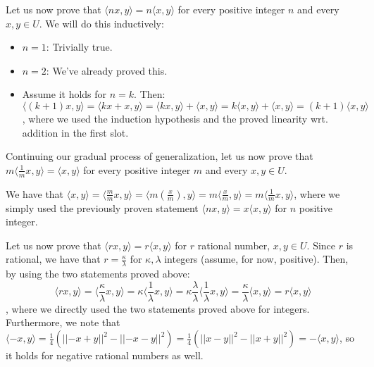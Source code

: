 \begin{solution}
\begin{itemize}
    Let us now prove that $\langle nx, y \rangle = n\langle x, y \rangle$ for every positive integer $n$ and every $x, y \in U$. We will do this inductively:
    \begin{itemize}
        \item $n = 1$: Trivially true.
        \item $n = 2$: We've already proved this.
        \item Assume it holds for $n = k$. Then: $\langle (k+1)x, y \rangle = \langle kx + x, y \rangle = \langle kx, y \rangle + \langle x, y \rangle = k\langle x , y \rangle + \langle x, y \rangle = (k+1)\langle x, y \rangle$, where we used the induction hypothesis and the proved linearity wrt. addition in the first slot.
    \end{itemize}

    Continuing our gradual process of generalization, let us now prove that $m\langle \frac{1}{m}x, y \rangle = \langle x, y \rangle$ for every positive integer $m$ and every $x ,y \in U$.

    We have that $\langle x, y \rangle = \langle \frac{m}{m}x, y \rangle = \langle m(\frac{x}{m}), y \rangle = m\langle \frac{x}{m}, y \rangle = m \langle \frac{1}{m}x, y \rangle$, where we simply used the previously proven statement $\langle nx, y \rangle = x \langle x, y \rangle$ for $n$ positive integer.

    Let us now prove that $\langle rx, y \rangle = r\langle x, y \rangle$ for $r$ rational number, $x, y \in U$. Since $r$ is rational, we have that $r = \frac{\kappa}{\lambda}$ for $\kappa, \lambda$ integers (assume, for now, positive). Then, by using the two statements proved above:
    $$\langle rx, y \rangle = \langle \frac{\kappa}{\lambda} x, y \rangle = \kappa \langle \frac{1}{\lambda}x, y \rangle = \kappa \frac{\lambda}{\lambda} \langle \frac{1}{\lambda}x, y \rangle = \frac{\kappa}{\lambda} \langle x, y \rangle = r \langle x, y \rangle$$
    , where we directly used the two statements proved above for integers. Furthermore, we note that $\langle -x, y \rangle = \frac{1}{4}(\lvert \lvert -x + y \rvert \rvert^2 - \lvert \lvert -x - y \rvert \rvert^2) = \frac{1}{4}(\lvert \lvert x - y \rvert \rvert^2 - \lvert \lvert x + y \rvert \rvert^2) = -\langle x, y \rangle$, so it holds for negative rational numbers as well.


\end{itemize}
\end{solution}
